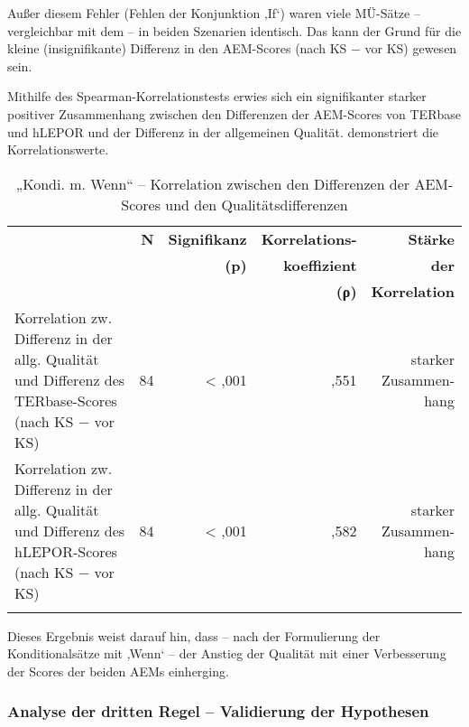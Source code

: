 Außer diesem Fehler (Fehlen der Konjunktion ‚If‘) waren viele MÜ-Sätze -- vergleichbar mit dem  -- in beiden Szenarien identisch. Das kann der Grund für die kleine (insignifikante) Differenz in den AEM-Scores (nach KS $-$ vor KS) gewesen sein.


Mithilfe des Spearman-Korrelationstests erwies sich ein signifikanter starker positiver Zusammenhang zwischen den Differenzen der AEM-Scores von TERbase und hLEPOR und der Differenz in der allgemeinen Qualität.  demonstriert die Korrelationswerte.


\begin{table}
\begin{tabularx}{\textwidth}{Xrrrr}
\lsptoprule
& \textbf{N} & { \textbf{Signifikanz} } & \textbf{Korrelations-} & \textbf{Stärke}\\
&&\textbf{(p)} & \textbf{koeffizient} & \textbf{der}\\
&&& \textbf{(ρ)}  & \textbf{Korrelation}\\
\midrule
Korrelation zw. Differenz in der allg. Qualität und Differenz des TERbase-Scores (nach KS $-$ vor KS) & { 84} & < ,001 & ,551 & \makecell[tr]{starker\\Zusammen-\\hang}\\
\tablevspace
Korrelation zw. Differenz in der allg. Qualität und Differenz des hLEPOR-Scores (nach KS $-$ vor KS) & { 84} & < ,001 & ,582 & \makecell[tr]{starker\\Zusammen-\\hang}\\
\lspbottomrule
\end{tabularx}
\caption{\label{tab:05:46} „Kondi. m. Wenn“ -- Korrelation zwischen den Differenzen der AEM-Scores und den Qualitätsdifferenzen }
\end{table}

Dieses Ergebnis weist darauf hin, dass -- nach der Formulierung der Konditionalsätze mit ‚Wenn‘ -- der Anstieg der Qualität mit einer Verbesserung der Scores der beiden AEMs einherging.

\subsubsection{\label{sec:5.3.3.7}Analyse der dritten Regel -- Validierung der Hypothesen}

